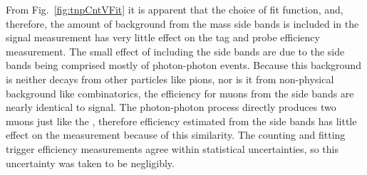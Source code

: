       From Fig.~\ref{fig:tnpCntVFit} it is apparent that the choice of fit 
        function, and, therefore, the amount of background from the mass side 
        bands is included in the signal measurement has very little effect on 
        the tag and probe efficiency measurement.
      The small effect of including the side bands are due to the side bands 
        being comprised mostly of photon-photon events.
      Because this background is neither decays from other particles like pions,
        nor is it from non-physical background like combinatorics, 
        the efficiency for muons from the side bands are nearly identical to
        \JPsi{} signal.
      The photon-photon process directly produces two muons just like the 
        \JPsi{}, therefore efficiency estimated from the side bands has 
        little effect on the measurement because of this similarity.
      The counting and fitting trigger efficiency measurements agree within 
        statistical uncertainties, so this uncertainty was taken to be 
        negligibly.
  
